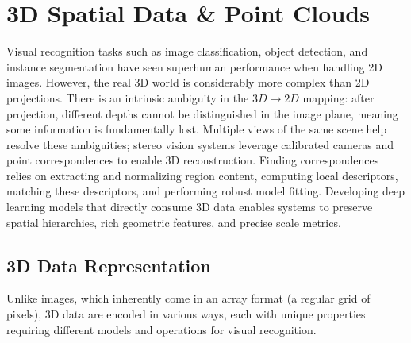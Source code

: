 \chapter{3D Spatial Data \& Point Clouds}
\label{ch:3d_spatial_data}

Visual recognition tasks such as image classification, object detection, and instance segmentation have seen superhuman performance when handling 2D images. However, the real 3D world is considerably more complex than 2D projections. There is an intrinsic ambiguity in the $3D \rightarrow 2D$ mapping: after projection, different depths cannot be distinguished in the image plane, meaning some information is fundamentally lost. Multiple views of the same scene help resolve these ambiguities; stereo vision systems leverage calibrated cameras and point correspondences to enable 3D reconstruction. Finding correspondences relies on extracting and normalizing region content, computing local descriptors, matching these descriptors, and performing robust model fitting. Developing deep learning models that directly consume 3D data enables systems to preserve spatial hierarchies, rich geometric features, and precise scale metrics.

\section{3D Data Representation}

Unlike images, which inherently come in an array format (a regular grid of pixels), 3D data are encoded in various ways, each with unique properties requiring different models and operations for visual recognition.


